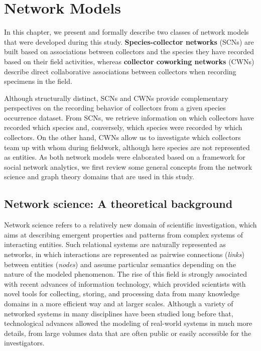 \chapter{Network Models}\label{chapter:network_models}

In this chapter, we present and formally describe two classes of network models that were developed during this study.
\textbf{Species-collector networks} (SCNs) are built based on associations between collectors and the species they have recorded based on their field activities, whereas \textbf{collector coworking networks} (CWNs) describe direct collaborative associations between collectors when recording specimens in the field.

Although structurally distinct, SCNs and CWNs provide complementary perspectives on the recording behavior of collectors from a given species occurrence dataset. 
From SCNs, we retrieve information on which collectors have recorded which species and, conversely, which species were recorded by which collectors. 
On the other hand, CWNs allow us to investigate which collectors team up with whom during fieldwork, although here species are not represented as entities.
As both network models were elaborated based on a framework for social network analytics, we first review some general concepts from the network science and graph theory domains that are used in this study.



\section{Network science: A theoretical background}\label{section:networkscience}

Network science refers to a relatively new domain of scientific investigation, which aims at describing emergent properties and patterns from complex systems of interacting entities.
Such relational systems are naturally represented as networks, in which interactions are represented as pairwise connections (\textit{links}) between entities (\textit{nodes}) and assume particular semantics depending on the nature of the modeled phenomenon.
The rise of this field is strongly associated with recent advances of information technology, which provided scientists with novel tools for collecting, storing, and processing data from many knowledge domains in a more efficient way and at larger scales.
Although a variety of networked systems in many disciplines have been studied long before that, technological advances allowed the modeling of real-world systems in much more details, from large volumes data that are often public or easily accessible for the investigators.


